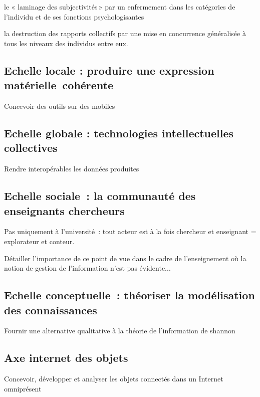 \documentclass[
  letterpaper,
  DIV=11,
  numbers=noendperiod]{scrreprt}
\begin{document}
le « laminage des subjectivités\,» par un enfermement dans les
catégories de l'individu et de ses fonctions psychologisantes

la destruction des rapports collectifs par une mise en concurrence
généralisée à tous les niveaux des individus entre eux.

\hypertarget{sec-echelleLocale}{%
\subsection{Echelle locale : produire une expression
matérielle~cohérente}\label{sec-echelleLocale}}

Concevoir des outils sur des mobiles

\hypertarget{sec-echelleGlobale}{%
\subsection{Echelle globale : technologies intellectuelles
collectives}\label{sec-echelleGlobale}}

Rendre interopérables les données produites

\hypertarget{sec-echelleSociale}{%
\subsection{Echelle sociale~: la communauté des enseignants
chercheurs}\label{sec-echelleSociale}}

Pas uniquement à l'université~: tout acteur est à la fois chercheur et
enseignant = explorateur et conteur.

Détailler l'importance de ce point de vue dans le cadre de
l'enseignement où la notion de gestion de l'information n'est pas
évidente...

\hypertarget{sec-echelleConcetuelle}{%
\subsection{Echelle conceptuelle~: théoriser la modélisation des
connaissances}\label{sec-echelleConcetuelle}}

Fournir une alternative qualitative à la théorie de l'information de
shannon

\hypertarget{sec-axeIOT}{%
\subsection{Axe internet des objets}\label{sec-axeIOT}}

Concevoir, développer et analyser les objets connectés dans un Internet
omniprésent
\end{document}
